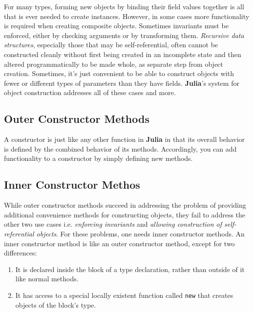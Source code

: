 \documentclass[
]{article}
\providecommand{\tightlist}{%
  \setlength{\itemsep}{0pt}\setlength{\parskip}{0pt}}
\begin{document}
For many types, forming new objects by binding their field values
together is all that is ever needed to create instances. However, in
some cases more functionality is required when creating composite
objects. Sometimes invariants must be enforced, either by checking
arguments or by transforming them. \emph{Recursive data structures},
especially those that may be self-referential, often cannot be
constructed cleanly without first being created in an incomplete state
and then altered programmatically to be made whole, as separate step
from object creation. Sometimes, it's just convenient to be able to
construct objects with fewer or different types of parameters than they
have fields. \textbf{Julia}'s system for object construction addresses
all of these cases and more.

\hypertarget{outer-constructor-methods}{%
\subsection{Outer Constructor Methods}\label{outer-constructor-methods}}

A constructor is just like any other function in \textbf{Julia} in that
its overall behavior is defined by the combined behavior of its methods.
Accordingly, you can add functionality to a constructor by simply
defining new methods.

\hypertarget{inner-constructor-methos}{%
\subsection{Inner Constructor Methos}\label{inner-constructor-methos}}

While outer constructor methods succeed in addressing the problem of
providing additional convenience methods for constructing objects, they
fail to address the other two use cases i.e. \emph{enforcing invariants}
and \emph{allowing construction of self-referential objects}. For these
problems, one needs inner constructor methods. An inner constructor
method is like an outer constructor method, except for two differences:

\begin{enumerate}
\def\labelenumi{\arabic{enumi}.}
\tightlist
\item
  It is declared inside the block of a type declaration, rather than
  outside of it like normal methods.
\item
  It has access to a special locally existent function called
  \texttt{new} that creates objects of the block's type.
\end{enumerate}
\end{document}
